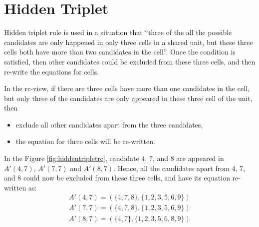 \documentclass[11pt]{report}
\newcommand{\set}[1]{\{ #1 \}}
\begin{document}
\section{Hidden Triplet}
\label{sec:Hidden Triplet}
Hidden triplet rule is used in a situation that ``three of the all the possible candidates are only happened in only three cells in a shared unit, but these three cells both have more than two candidates in the cell''. Once the condition is satisfied, then other candidates could be excluded from these three cells, and then re-write the equations for cells.

In the rc-view, if there are three cells have more than one candidates in the cell, but only three of the candidates are only appeared in these three cell of the unit, then
\begin{itemize}
\item exclude all other candidates apart from the three candidates,
\item the equation for three cells will be re-written.
\end{itemize}

In the Figure \ref{fig:hiddentripletrc}, candidate $4$, $7$, and $8$ are appeared in $A'(4,7)$, $A'(7,7)$ and $A'(8,7)$. Hence, all the candidates apart from $4$, $7$, and $8$ could now be excluded from these three cells, and have its equation re-written as:
\begin{eqnarray*}
A'(4,7) = (\set{4, 7, 8}, \set{1, 2, 3, 5, 6, 9})\\
A'(7,7) = (\set{4, 7, 8}, \set{1, 2, 3, 5, 6, 9})\\
A'(8,7) = (\set{4, 7}, \set{1, 2, 3, 5, 6, 8, 9})\\
\end{eqnarray*}
\end{document}
